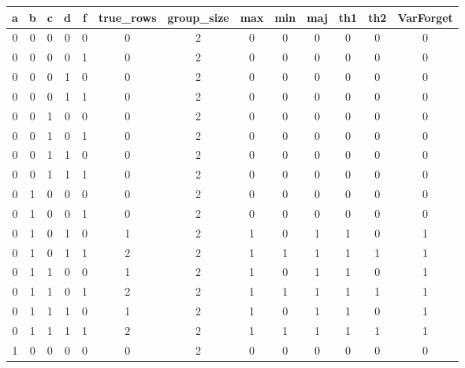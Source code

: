 \begin{table}[!tb]
    \centering
    \begin{tabular}{|c|c|c|c|c|c|c|c|c|c|c|c|c|}
        \hline
        \textbf{a} & \textbf{b} & \textbf{c} & \textbf{d} & \textbf{f} & \textbf{true\_rows} & \textbf{group\_size} & \textbf{max} & \textbf{min} & \textbf{maj} & \textbf{th1} & \textbf{th2} & \textbf{VarForget} \\ \hline
        \rowcolor{gray!40} 0 & 0 & 0 & 0 & 0 & 0 & 2 & 0 & 0 & 0 & 0 & 0 & 0 \\ \hline
        \rowcolor{blue!40} 0 & 0 & 0 & 0 & 1 & 0 & 2 & 0 & 0 & 0 & 0 & 0 & 0 \\ \hline
        \rowcolor{red!40} 0 & 0 & 0 & 1 & 0 & 0 & 2 & 0 & 0 & 0 & 0 & 0 & 0 \\ \hline
        \rowcolor{green!40} 0 & 0 & 0 & 1 & 1 & 0 & 2 & 0 & 0 & 0 & 0 & 0 & 0 \\ \hline
        \rowcolor{yellow!40} 0 & 0 & 1 & 0 & 0 & 0 & 2 & 0 & 0 & 0 & 0 & 0 & 0 \\ \hline
        \rowcolor{gray!40} 0 & 0 & 1 & 0 & 1 & 0 & 2 & 0 & 0 & 0 & 0 & 0 & 0 \\ \hline
        \rowcolor{blue!40} 0 & 0 & 1 & 1 & 0 & 0 & 2 & 0 & 0 & 0 & 0 & 0 & 0 \\ \hline
        \rowcolor{red!40} 0 & 0 & 1 & 1 & 1 & 0 & 2 & 0 & 0 & 0 & 0 & 0 & 0 \\ \hline
        \rowcolor{green!40} 0 & 1 & 0 & 0 & 0 & 0 & 2 & 0 & 0 & 0 & 0 & 0 & 0 \\ \hline
        \rowcolor{yellow!40} 0 & 1 & 0 & 0 & 1 & 0 & 2 & 0 & 0 & 0 & 0 & 0 & 0 \\ \hline
        \rowcolor{gray!40} 0 & 1 & 0 & 1 & 0 & 1 & 2 & 1 & 0 & 1 & 1 & 0 & 1 \\ \hline
        \rowcolor{blue!40} 0 & 1 & 0 & 1 & 1 & 2 & 2 & 1 & 1 & 1 & 1 & 1 & 1 \\ \hline
        \rowcolor{red!40} 0 & 1 & 1 & 0 & 0 & 1 & 2 & 1 & 0 & 1 & 1 & 0 & 1 \\ \hline
        \rowcolor{green!40} 0 & 1 & 1 & 0 & 1 & 2 & 2 & 1 & 1 & 1 & 1 & 1 & 1 \\ \hline
        \rowcolor{yellow!40} 0 & 1 & 1 & 1 & 0 & 1 & 2 & 1 & 0 & 1 & 1 & 0 & 1 \\ \hline
        \rowcolor{gray!40} 0 & 1 & 1 & 1 & 1 & 2 & 2 & 1 & 1 & 1 & 1 & 1 & 1 \\ \hline
        \rowcolor{blue!40} 1 & 0 & 0 & 0 & 0 & 0 & 2 & 0 & 0 & 0 & 0 & 0 & 0 \\ \hline

\end{tabular}
\end{table}
